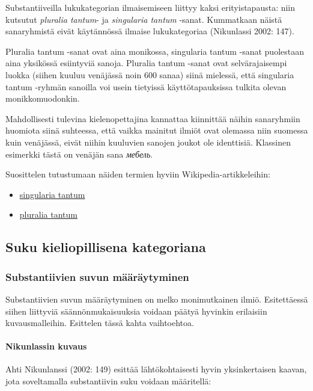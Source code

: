 \documentclass[]{scrartcl}
\providecommand{\tightlist}{%
  \setlength{\itemsep}{0pt}\setlength{\parskip}{0pt}}
\begin{document}
Substantiiveilla lukukategorian ilmaisemiseen liittyy kaksi
erityistapausta: niin kutsutut \emph{pluralia tantum}- ja
\emph{singularia tantum} -sanat. Kummatkaan näistä sanaryhmistä eivät
käytännössä ilmaise lukukategoriaa (Nikunlassi 2002: 147).

Pluralia tantum -sanat ovat aina monikossa, singularia tantum -sanat
puolestaan aina yksikössä esiintyviä sanoja. Pluralia tantum -sanat ovat
selvärajaisempi luokka (siihen kuuluu venäjässä noin 600 sanaa) siinä
mielessä, että singularia tantum -ryhmän sanoilla voi usein tietyissä
käyttötapauksissa tulkita olevan monikkomuodonkin.

Mahdollisesti tulevina kielenopettajina kannattaa kiinnittää näihin
sanaryhmiin huomiota siinä suhteessa, että vaikka mainitut ilmiöt ovat
olemassa niin suomessa kuin venäjässä, eivät niihin kuuluvien sanojen
joukot ole identtisiä. Klassinen esimerkki tästä on venäjän sana
\emph{мебель}.

Suosittelen tutustumaan näiden termien hyviin Wikipedia-artikkeleihin:

\begin{itemize}
\tightlist
\item
  \href{https://ru.wikipedia.org/wiki/Singularia_tantum}{singularia
  tantum}
\item
  \href{https://ru.wikipedia.org/wiki/Pluralia_tantum}{pluralia tantum}
\end{itemize}

\subsection{Suku kieliopillisena
kategoriana}\label{suku-kieliopillisena-kategoriana}

\subsubsection{Substantiivien suvun
määräytyminen}\label{substantiivien-suvun-muxe4uxe4ruxe4ytyminen}

Substantiivien suvun määräytyminen on melko monimutkainen ilmiö.
Esitettäessä siihen liittyviä säännönmukaisuuksia voidaan päätyä
hyvinkin erilaisiin kuvausmalleihin. Esittelen tässä kahta vaihtoehtoa.

\paragraph{Nikunlassin kuvaus}\label{nikunlassin-kuvaus}

Ahti Nikunlanssi (2002: 149) esittää lähtökohtaisesti hyvin
yksinkertaisen kaavan, jota soveltamalla substantiivin suku voidaan
määritellä:
\end{document}
